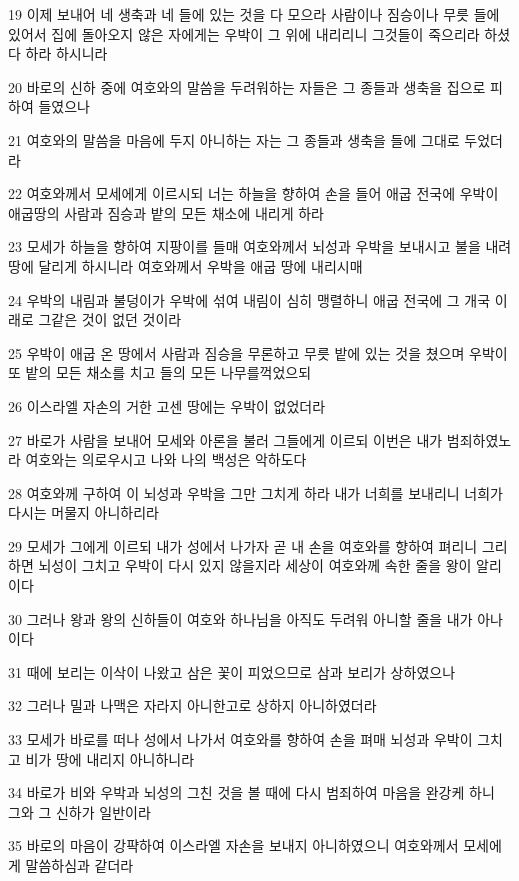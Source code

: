 \par 19 이제 보내어 네 생축과 네 들에 있는 것을 다 모으라 사람이나 짐승이나 무릇 들에 있어서 집에 돌아오지 않은 자에게는 우박이 그 위에 내리리니 그것들이 죽으리라 하셨다 하라 하시니라
\par 20 바로의 신하 중에 여호와의 말씀을 두려워하는 자들은 그 종들과 생축을 집으로 피하여 들였으나
\par 21 여호와의 말씀을 마음에 두지 아니하는 자는 그 종들과 생축을 들에 그대로 두었더라
\par 22 여호와께서 모세에게 이르시되 너는 하늘을 향하여 손을 들어 애굽 전국에 우박이 애굽땅의 사람과 짐승과 밭의 모든 채소에 내리게 하라
\par 23 모세가 하늘을 향하여 지팡이를 들매 여호와께서 뇌성과 우박을 보내시고 불을 내려 땅에 달리게 하시니라 여호와께서 우박을 애굽 땅에 내리시매
\par 24 우박의 내림과 불덩이가 우박에 섞여 내림이 심히 맹렬하니 애굽 전국에 그 개국 이래로 그같은 것이 없던 것이라
\par 25 우박이 애굽 온 땅에서 사람과 짐승을 무론하고 무릇 밭에 있는 것을 쳤으며 우박이 또 밭의 모든 채소를 치고 들의 모든 나무를꺽었으되
\par 26 이스라엘 자손의 거한 고센 땅에는 우박이 없었더라
\par 27 바로가 사람을 보내어 모세와 아론을 불러 그들에게 이르되 이번은 내가 범죄하였노라 여호와는 의로우시고 나와 나의 백성은 악하도다
\par 28 여호와께 구하여 이 뇌성과 우박을 그만 그치게 하라 내가 너희를 보내리니 너희가 다시는 머물지 아니하리라
\par 29 모세가 그에게 이르되 내가 성에서 나가자 곧 내 손을 여호와를 향하여 펴리니 그리하면 뇌성이 그치고 우박이 다시 있지 않을지라 세상이 여호와께 속한 줄을 왕이 알리이다
\par 30 그러나 왕과 왕의 신하들이 여호와 하나님을 아직도 두려워 아니할 줄을 내가 아나이다
\par 31 때에 보리는 이삭이 나왔고 삼은 꽃이 피었으므로 삼과 보리가 상하였으나
\par 32 그러나 밀과 나맥은 자라지 아니한고로 상하지 아니하였더라
\par 33 모세가 바로를 떠나 성에서 나가서 여호와를 향하여 손을 펴매 뇌성과 우박이 그치고 비가 땅에 내리지 아니하니라
\par 34 바로가 비와 우박과 뇌성의 그친 것을 볼 때에 다시 범죄하여 마음을 완강케 하니 그와 그 신하가 일반이라
\par 35 바로의 마음이 강퍅하여 이스라엘 자손을 보내지 아니하였으니 여호와께서 모세에게 말씀하심과 같더라

